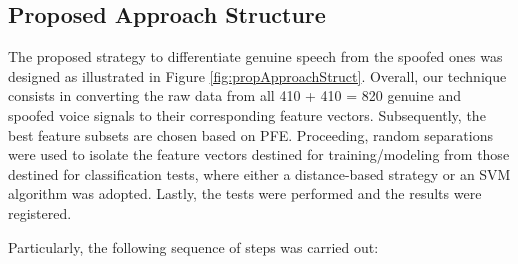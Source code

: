 \subsection{Proposed Approach Structure}
\par The proposed strategy to differentiate genuine speech from the spoofed ones was designed as illustrated in Figure \ref{fig:propApproachStruct}. Overall, our technique consists in converting the raw data from all 410 + 410 = 820 genuine and spoofed voice signals to their corresponding feature vectors. Subsequently, the best feature subsets are chosen based on PFE. Proceeding, random separations were used to isolate the feature vectors destined for training/modeling from those destined for classification tests, where either a distance-based strategy or an SVM algorithm \cite{bennett2000support} was adopted. Lastly, the tests were performed and the results were registered.
\\
\par Particularly, the following sequence of steps was carried out:
